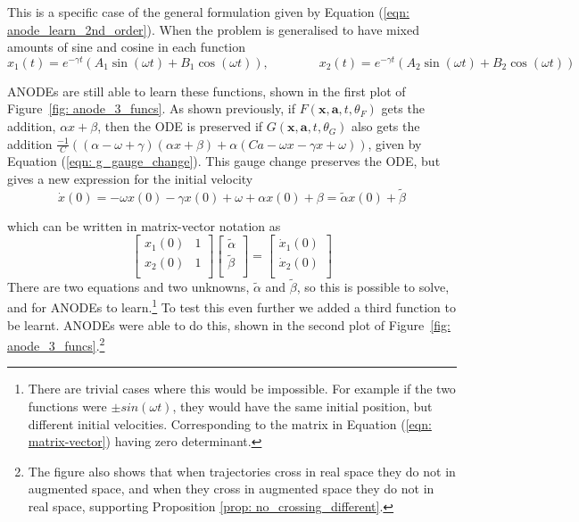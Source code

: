 \documentclass{article}
\theoremstyle{remark}
\theoremstyle{definition}
\begin{document}
This is a specific case of the general formulation given by Equation (\ref{eqn: anode_learn_2nd_order}). When the problem is generalised to have mixed amounts of sine and cosine in each function
\begin{equation}
x_{1}(t) = e^{-\gamma t}(A_{1}\sin(\omega t) + B_{1}\cos(\omega t)),
\qquad
\qquad
x_{2}(t) = e^{-\gamma t}(A_{2}\sin(\omega t) + B_{2}\cos(\omega t))
\end{equation}

ANODEs are still able to learn these functions, shown in the first plot of Figure~\ref{fig: anode_3_funcs}. As shown previously, if 
$F(\mathbf{x}, \mathbf{a}, t, \theta_{F})$ gets the addition, $\alpha x + \beta$, then the ODE is preserved if $G(\mathbf{x}, \mathbf{a}, t, \theta_{G})$ also gets the addition $\displaystyle  \frac{-1}{C}((\alpha - \omega + \gamma)(\alpha x + \beta)+ \alpha(C a - \omega x - \gamma x + \omega))$, given by Equation (\ref{eqn: g_gauge_change}). This gauge change preserves the ODE, but gives a new expression for the initial velocity
\begin{equation}
\dot{x}(0) = -\omega x(0) -\gamma x(0) + \omega + \alpha x(0) + \beta = \tilde{\alpha}x(0) + \tilde{\beta}
\end{equation}

which can be written in matrix-vector notation as
\begin{equation}
\label{eqn: matrix-vector}
    \begin{bmatrix}
    x_{1}(0) & 1 \\
    x_{2}(0) & 1 \\
    \end{bmatrix}
    \begin{bmatrix}
    \tilde{\alpha} \\
    \tilde{\beta} \\
    \end{bmatrix}
    =
    \begin{bmatrix}
    \dot{x}_{1}(0) \\
    \dot{x}_{2}(0) \\
    \end{bmatrix}
\end{equation}
There are two equations and two unknowns, $\tilde{\alpha}$ and $\tilde{\beta}$, so this is possible to solve, and for ANODEs to learn.\footnote{There are trivial cases where this would be impossible. For example if the two functions were $\pm sin(\omega t)$, they would have the same initial position, but different initial velocities. Corresponding to the matrix in Equation (\ref{eqn: matrix-vector}) having zero determinant.} To test this even further we added a third function to be learnt. ANODEs were able to do this, shown in the second plot of Figure~\ref{fig: anode_3_funcs}.\footnote{The figure also shows that when trajectories cross in real space they do not in augmented space, and when they cross in augmented space they do not in real space, supporting Proposition \ref{prop: no_crossing_different}.} 
\end{document}
